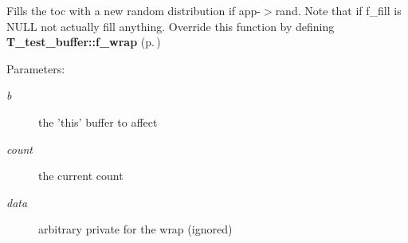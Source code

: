 Fills the toc with a new random distribution if app-$>$rand. Note that if f\_\-fill is NULL not actually fill anything. Override this function by defining {\bf T\_\-test\_\-buffer::f\_\-wrap} {\rm (p.\,\pageref{structT__test__buffer_m20})} \begin{Desc}
\item[Parameters: ]\par
\begin{description}
\item[{\em 
b}]the 'this' buffer to affect \item[{\em 
count}]the current count \item[{\em 
data}]arbitrary private for the wrap (ignored) \end{description}
\end{Desc}
